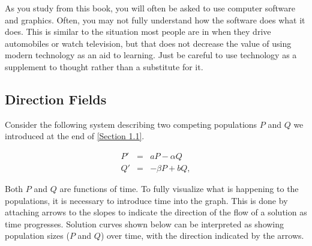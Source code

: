 \documentclass{ximera}
\begin{document}
As you study from this book, you will often be asked to use
computer software and graphics.
Often, you may not fully understand how the software does what it does.
This is similar to the situation most people are in when they drive
automobiles or watch television, but that does not decrease the value
of using modern technology as an aid to learning. Just be careful to use technology as a supplement to thought rather than a
substitute for it.


\subsection{Direction Fields}

Consider the following system describing two competing populations $P$ and $Q$ we introduced at the end of \ref{Section 1.1}.

\begin{eqnarray*}
P'&=&aP-\alpha Q\\
Q'&=&-\beta P+bQ,
\end{eqnarray*}

Both $P$ and $Q$ are functions of time. To fully visualize what is happening to the populations, it is necessary to introduce time into the graph.  This is done by attaching arrows to the slopes to indicate the direction of the flow of a solution as time progresses.  Solution curves shown below can be interpreted as showing population sizes ($P$ and $Q$) over time, with the direction indicated by the arrows.  

\begin{center}  
\end{center}
\end{document}
